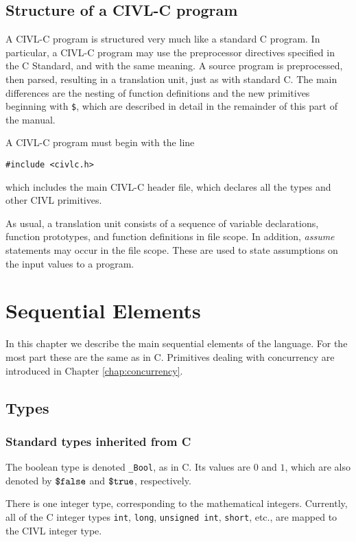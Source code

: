 \section{Structure of a CIVL-C program}

A CIVL-C program is structured very much like a standard C program.
In particular, a CIVL-C program may use the preprocessor directives
specified in the C Standard, and with the same meaning.  A source
program is preprocessed, then parsed, resulting in a translation unit,
just as with standard C.  The main differences are the nesting of
function definitions and the new primitives beginning with
\texttt{\$}, which are described in detail in the remainder of this
part of the manual.

A CIVL-C program must begin with the line
\begin{verbatim}
#include <civlc.h>
\end{verbatim}
which includes the main CIVL-C header file, which declares all the
types and other CIVL primitives.

As usual, a translation unit consists of a sequence of variable
declarations, function prototypes, and function definitions in file
scope.  In addition, \emph{assume} statements may occur in the file
scope.  These are used to state assumptions on the input values
to a program.

\chapter{Sequential Elements}

In this chapter we describe the main sequential elements of the
language.  For the most part these are the same as in C.
Primitives dealing with concurrency are introduced in Chapter
\ref{chap:concurrency}.

\section{Types}

\subsection{Standard types inherited from C}

The boolean type is denoted \verb!_Bool!, as in C. Its values are $0$
and $1$, which are also denoted by $\mbox{\texttt{\${}false}}$ and $\mbox{\texttt{\${}true}}$,
respectively.

There is one integer type, corresponding to the mathematical integers.
Currently, all of the C integer types \texttt{int}, \texttt{long},
\texttt{unsigned\ int}, \texttt{short}, etc., are mapped to the CIVL
integer type.

